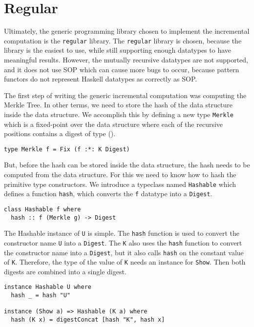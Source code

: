 \section{Regular}

Ultimately, the generic programming library chosen to implement the incremental computation is the \texttt{regular} library. The \texttt{regular} library is chosen, because the library is the easiest to use, while still supporting enough datatypes to have meaningful results. However, the mutually recursive datatypes are not supported, and it does not use SOP which can cause more bugs to occur, because pattern functors do not represent Haskell datatypes as correctly as SOP.

The first step of writing the generic incremental computation was computing the Merkle Tree. In other terms, we need to store the hash of the data structure inside the data structure. We accomplish this by defining a new type \texttt{Merkle} which is a fixed-point over the data structure where each of the recursive positions contains a digest of type ().

\begin{verbatim}
type Merkle f = Fix (f :*: K Digest)
\end{verbatim}

But, before the hash can be stored inside the data structure, the hash needs to be computed from the data structure. For this we need to know how to hash the primitive type constructors. We introduce a typeclass named \texttt{Hashable} which defines a function \texttt{hash}, which converts the \texttt{f} datatype into a \texttt{Digest}.

\begin{verbatim}
class Hashable f where
  hash :: f (Merkle g) -> Digest
\end{verbatim}

The Hashable instance of \texttt{U} is simple. The \texttt{hash} function is used to convert the constructor name \texttt{U} into a \texttt{Digest}. The \texttt{K} also uses the \texttt{hash} function to convert the constructor name into a \texttt{Digest}, but it also calls \texttt{hash} on the constant value of \texttt{K}. Therefore, the type of the value of \texttt{K} needs an instance for \texttt{Show}. Then both digests are combined into a single digest. 

\pagebreak
\begin{verbatim}
instance Hashable U where
  hash _ = hash "U"

instance (Show a) => Hashable (K a) where
  hash (K x) = digestConcat [hash "K", hash x]
\end{verbatim}

